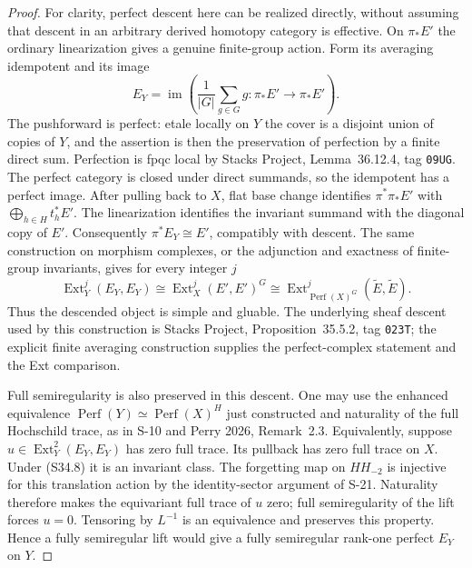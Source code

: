 \documentclass[11pt,a4paper]{article}
\theoremstyle{definition}
\begin{document}
\begin{proof}
For clarity, perfect descent here can be realized directly,
without assuming that descent in an arbitrary derived
homotopy category is effective. On $\pi_*E'$ the ordinary
linearization gives a genuine finite-group action. Form its
averaging idempotent and its image
\[
 E_Y=\operatorname{im}\left(
  \frac1{|G|}\sum_{g\in G}g:\pi_*E'\longrightarrow\pi_*E'
                         \right).
 \tag{S34.7}
\]
The pushforward is perfect: etale locally on $Y$ the
cover is a disjoint union of copies of $Y$, and the
assertion is then the preservation of perfection by a
finite direct sum. Perfection is fpqc local by Stacks
Project, Lemma~36.12.4, tag \texttt{09UG}.
The perfect category is closed under direct summands, so
the idempotent has a perfect image. After pulling back to
$X$, flat base change identifies $\pi^*\pi_*E'$ with
$\bigoplus_{h\in H}t_h^*E'$. The linearization identifies
the invariant summand with the diagonal copy of $E'$.
Consequently $\pi^*E_Y\cong E'$, compatibly with descent.
The same construction on morphism complexes, or the
adjunction and exactness of finite-group invariants, gives
for every integer $j$
\[
 \operatorname{Ext}^j_Y(E_Y,E_Y)
      \cong \operatorname{Ext}^j_X(E',E')^G
      \cong
      \operatorname{Ext}^j_{\operatorname{Perf}(X)^G}
                   (\widetilde E,\widetilde E).
 \tag{S34.8}
\]
Thus the descended object is simple and gluable. The
underlying sheaf descent used by this construction is
Stacks Project, Proposition~35.5.2, tag \texttt{023T};
the explicit finite averaging construction supplies the
perfect-complex statement and the Ext comparison.

Full semiregularity is also preserved in this descent.
One may use the enhanced equivalence
$\operatorname{Perf}(Y)\simeq
\operatorname{Perf}(X)^H$ just constructed and naturality
of the full Hochschild trace, as in S-10 and Perry 2026,
Remark~2.3. Equivalently, suppose
$u\in\operatorname{Ext}^2_Y(E_Y,E_Y)$ has zero full trace.
Its pullback has zero full trace on $X$. Under (S34.8)
it is an invariant class. The forgetting map on
$HH_{-2}$ is injective for this translation action by
the identity-sector argument of S-21. Naturality
therefore makes the equivariant full trace of $u$ zero;
full semiregularity of the lift forces $u=0$.
Tensoring by $L^{-1}$ is an equivalence and preserves
this property. Hence a fully semiregular lift would
give a fully semiregular rank-one perfect $E_Y$ on $Y$.


\end{proof}
\end{document}
